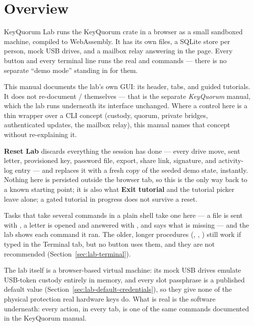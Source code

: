 \section{Overview}

KeyQuorum Lab runs the KeyQuorum crate in a browser as a small sandboxed
machine, compiled to WebAssembly. It has its own files, a SQLite store per
person, mock USB drives, and a mailbox relay answering in the page. Every
button and every terminal line runs the real  and
 commands --- there is no separate ``demo mode''
standing in for them.

\begin{noteBox}
This manual documents the lab's own GUI: its header, tabs, and guided
tutorials. It does not re-document  / 
themselves --- that is the separate \emph{KeyQuorum} manual, which the lab
runs underneath its interface unchanged. Where a control here is a thin
wrapper over a CLI concept (custody, quorum, private bridges, authenticated
updates, the mailbox relay), this manual names that concept without
re-explaining it.
\end{noteBox}


\textbf{Reset Lab} discards everything the session has done --- every
drive move, sent letter, provisioned key, password file, export, share
link, signature, and activity-log entry --- and replaces it with a fresh
copy of the seeded demo state, instantly. Nothing here is persisted
outside the browser tab, so this is the only way back to a known starting
point; it is also what \textbf{Exit tutorial} and the tutorial picker
leave alone; a gated tutorial in progress does not survive a reset.

Tasks that take several commands in a plain shell take one here --- a file is
sent with , a letter is opened and answered with
, and  says what is
missing --- and the lab shows each command it ran. The older, longer
procedures (, , )
still work if typed in the Terminal tab, but no button uses them, and they are
not recommended (Section~\ref{sec:lab-terminal}).

The lab itself is a browser-based virtual machine: its mock USB drives
emulate USB-token custody entirely in memory, and every slot passphrase is
a published default value (Section~\ref{sec:lab-default-credentials}), so
they give none of the physical protection real hardware keys do. What is
real is the software underneath: every action, in every tab, is one of the
same commands documented in the KeyQuorum manual.

